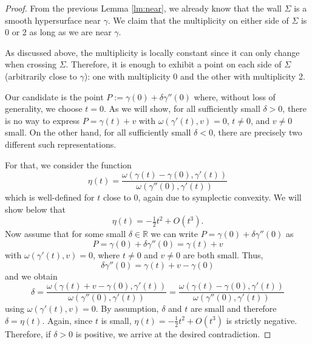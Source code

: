 \documentclass[12pt]{article}
\newcommand{\g}{{\gamma}}
\newcommand{\R}{{\mathbb R}}
\begin{document}
\begin{proof}
From the previous Lemma \ref{lm:near}, we already know that the wall $\Sigma$ is a smooth hypersurface near $\gamma$. We claim that the multiplicity on either side of $\Sigma$ is 0 or 2 as long as we are near $\gamma$. 

As discussed above, the multiplicity is locally constant since it can only change when crossing $\Sigma$. Therefore, it is enough to exhibit a point on each side of $\Sigma$ (arbitrarily close to $\gamma$): one with multiplicity 0 and the other with multiplicity 2. 

Our candidate is the point $P:=\gamma(0)+\delta\gamma''(0)$ where, without loss of generality, we choose $t=0$. As we will show, for all sufficiently small $\delta>0$, there is no way to express $P=\gamma(t)+v$ with $\omega(\gamma'(t),v)=0$, $t\neq0$, and $v\neq0$ small. On the other hand, for all sufficiently small $\delta<0$, there are precisely two different such representations.

For that, we consider the function
\begin{equation}\label{eqn:def_eta}
\eta(t) =\frac{\omega(\gamma(t)-\gamma(0),\gamma'(t))}{\omega(\gamma''(0),\gamma'(t))}
\end{equation}
which is well-defined for $t$ close to $0$, again due to symplectic convexity. 
We will show below that
\begin{equation}
\eta(t)=-\tfrac12t^2+O(t^3).
\end{equation}
Now assume that for some small $\delta\in\R$ we can write $P=\gamma(0)+\delta\gamma''(0)$ as 
\begin{equation}\nonumber
P=\gamma(0)+\delta\gamma''(0)=\gamma(t)+v
\end{equation}
with $\omega(\gamma'(t),v)=0$, where $t\neq0$ and $v\neq0$ are both small. Thus,
\begin{equation}\nonumber
\delta\g''(0)=\g(t)+v-\g(0)
\end{equation}
and we obtain
\begin{equation}\nonumber
\delta=\frac{\omega(\gamma(t)+v-\gamma(0),\gamma'(t))}{\omega(\gamma''(0),\gamma'(t))}=\frac{\omega(\gamma(t)-\gamma(0),\gamma'(t))}{\omega(\gamma''(0),\gamma'(t))}
\end{equation}
using $\omega(\gamma'(t),v)=0$. By assumption, $\delta$ and $t$ are small and therefore $\delta=\eta(t)$. Again, since $t$ is small, $\eta(t)=-\tfrac12t^2+O(t^3)$ is strictly negative. Therefore, if $\delta>0$ is positive, we arrive at the desired contradiction. 


\end{proof}
\end{document}
